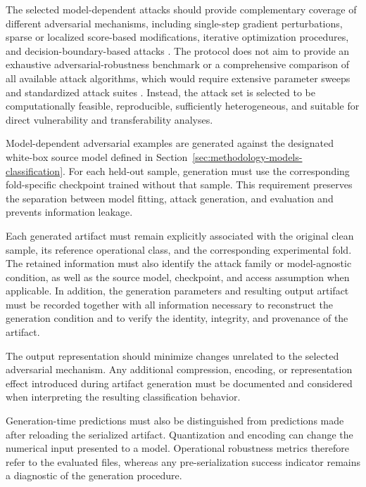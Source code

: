 The selected model-dependent attacks should provide complementary coverage of
different adversarial mechanisms, including single-step gradient
perturbations, sparse or localized score-based modifications, iterative
optimization procedures, and decision-boundary-based attacks
\cite{goodfellow2015explaining,su2019onepixel,zhao2024sigmazero,moosavi2016deepfool}.
The protocol does not aim to provide an exhaustive adversarial-robustness
benchmark or a comprehensive comparison of all available attack algorithms,
which would require extensive parameter sweeps and standardized attack suites
\cite{madry2018towards,croce2020autoattack}. Instead, the attack set is selected
to be computationally feasible, reproducible, sufficiently heterogeneous, and
suitable for direct vulnerability and transferability analyses.

Model-dependent adversarial examples are generated against the designated
white-box source model defined in
Section~\ref{sec:methodology-models-classification}. For each held-out sample,
generation must use the corresponding fold-specific checkpoint trained without
that sample. This requirement preserves the separation between model fitting,
attack generation, and evaluation and prevents information leakage.


Each generated artifact must remain explicitly associated with the original clean
sample, its reference operational class, and the corresponding experimental
fold. The retained information must also identify the attack family or
model-agnostic condition, as well as the source model, checkpoint, and access
assumption when applicable. In addition, the generation parameters and resulting
output artifact must be recorded together with all information necessary to
reconstruct the generation condition and to verify the identity, integrity, and
provenance of the artifact.



The output representation should minimize changes unrelated to the selected
adversarial mechanism. Any additional compression, encoding, or representation
effect introduced during artifact generation must be documented and considered
when interpreting the resulting classification behavior.

Generation-time predictions must also be distinguished from predictions made
after reloading the serialized artifact. Quantization and encoding can change
the numerical input presented to a model. Operational robustness metrics
therefore refer to the evaluated files, whereas any pre-serialization success
indicator remains a diagnostic of the generation procedure.


